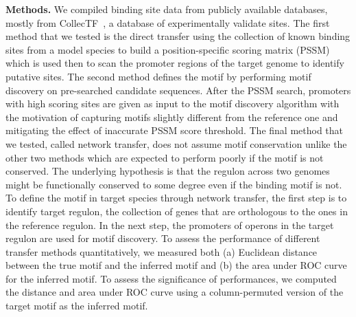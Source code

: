 \documentclass{llncs}
\begin{document}
\textbf{Methods.} We compiled binding site data from publicly available
databases, mostly from CollecTF~\cite{kilic2013collectf}, a database of
experimentally validate sites. The first method that we tested is the direct
transfer using the collection of known binding sites from a model species to
build a position-specific scoring matrix (PSSM) which is used then to scan the
promoter regions of the target genome to identify putative sites. The second
method defines the motif by performing motif discovery on pre-searched candidate
sequences. After the PSSM search, promoters with high scoring sites are given as
input to the motif discovery algorithm with the motivation of capturing motifs
slightly different from the reference one and mitigating the effect of
inaccurate PSSM score threshold. The final method that we tested, called network
transfer, does not assume motif conservation unlike the other two methods which
are expected to perform poorly if the motif is not conserved. The underlying
hypothesis is that the regulon across two genomes might be functionally
conserved to some degree even if the binding motif is not. To define the motif
in target species through network transfer, the first step is to identify target
regulon, the collection of genes that are orthologous to the ones in the
reference regulon. In the next step, the promoters of operons in the target
regulon are used for motif discovery. To assess the performance of different
transfer methods quantitatively, we measured both (a) Euclidean distance between
the true motif and the inferred motif and (b) the area under ROC curve for the
inferred motif. To assess the significance of performances, we computed the
distance and area under ROC curve using a column-permuted version of the target
motif as the inferred motif.
\end{document}
